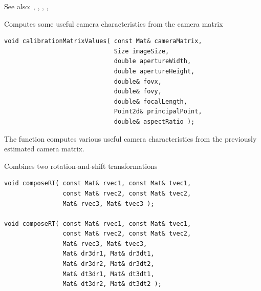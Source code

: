 \begin{description}
See also: , , , , 


\label{calibrationMatrixValues}
Computes some useful camera characteristics from the camera matrix

\begin{lstlisting}
void calibrationMatrixValues( const Mat& cameraMatrix,
                              Size imageSize,
                              double apertureWidth,
                              double apertureHeight,
                              double& fovx,
                              double& fovy,
                              double& focalLength,
                              Point2d& principalPoint,
                              double& aspectRatio );
\end{lstlisting}
\begin{description}
\end{description}

The function computes various useful camera characteristics from the previously estimated camera matrix.

\label{composeRT}
Combines two rotation-and-shift transformations

\begin{lstlisting}
void composeRT( const Mat& rvec1, const Mat& tvec1,
                const Mat& rvec2, const Mat& tvec2,
                Mat& rvec3, Mat& tvec3 );
                
void composeRT( const Mat& rvec1, const Mat& tvec1,
                const Mat& rvec2, const Mat& tvec2,
                Mat& rvec3, Mat& tvec3,
                Mat& dr3dr1, Mat& dr3dt1,
                Mat& dr3dr2, Mat& dr3dt2,
                Mat& dt3dr1, Mat& dt3dt1,
                Mat& dt3dr2, Mat& dt3dt2 );
\end{lstlisting}
\begin{description}
\end{description}


\end{description}
